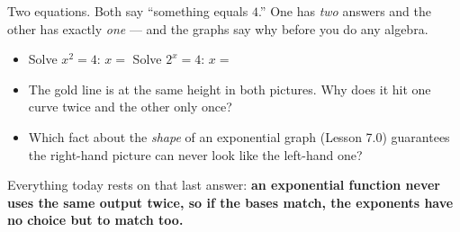 \documentclass[10pt]{article}
\newcommand{\lgrid}[4]{%
  \draw[step=1, linegray!40, very thin] (#1,#3) grid (#2,#4);
  \draw[->, semithick, charcoal] (#1,0)--(#2,0) node[below right, font=\scriptsize]{$x$};
  \draw[->, semithick, charcoal] (0,#3)--(0,#4) node[left, font=\scriptsize]{$y$};}
\newcommand{\expgraph}[6]{\draw[very thick, forest, domain=#5:#6, samples=140, smooth]
  plot (\x,{(#1)*exp((#2)*((\x)-(#3)))+(#4)});}
\newcommand{\solline}[3]{\draw[goldacc, very thick] (#1,#3)--(#2,#3);}
\begin{document}
\begin{hookbox}
\begin{minipage}{\linewidth}
Two equations. Both say ``something equals $4$.'' One has \emph{two} answers and the other has exactly
\emph{one} --- and the graphs say why before you do any algebra.
\begin{center}
\end{center}
\end{minipage}
\vspace{4pt}
\begin{itemize}\setlength{\itemsep}{1pt}
  \item Solve $x^{2}=4$: \; $x=$ \blank{2.2cm} \qquad Solve $2^{x}=4$: \; $x=$ \blank{2.2cm}
  \item The gold line is at the same height in both pictures. Why does it hit one curve twice and the other only once? \writeline
  \item Which fact about the \emph{shape} of an exponential graph (Lesson 7.0) guarantees the right-hand picture can never look like the left-hand one? \writeline
\end{itemize}
Everything today rests on that last answer: \textbf{an exponential function never uses the same output
twice, so if the bases match, the exponents have no choice but to match too.}
\end{hookbox}
\end{document}
